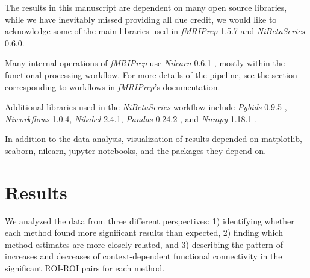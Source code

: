 \documentclass[phd,appendix,figures]{uithesis}
\begin{document}
The results in this manuscript are dependent on many open source
libraries, while we have inevitably missed providing all due credit,
we would like to acknowledge some of the main libraries used in 
\emph{fMRIPrep} 1.5.7\cite{fmriprep1} and \emph{NiBetaSeries} 0.6.0\cite{Kent2018}.

Many internal operations of \emph{fMRIPrep} use \emph{Nilearn} 0.6.1
\cite[RRID:SCR\_001362]{nilearn}, mostly within the functional
processing workflow. For more details of the pipeline, see
\href{https://fmriprep.readthedocs.io/en/latest/workflows.html}{the
section corresponding to workflows in \emph{fMRIPrep}'s documentation}.

Additional libraries used in the \emph{NiBetaSeries} workflow include
\emph{Pybids} 0.9.5 \cite{Yarkoni2019}, \emph{Niworkflows} 1.0.4,
\emph{Nibabel} 2.4.1, \emph{Pandas} 0.24.2 \cite{McKinney2010}, and
\emph{Numpy} 1.18.1 \cite{VanDerWalt2011, Oliphant2006}.

In addition to the data analysis, visualization of results depended
on matplotlib\cite{Hunter2007}, seaborn\cite{Waskom2020}, nilearn,
jupyter notebooks\cite{Kluyver2016a}, and the packages they depend on.

\section{Results}
We analyzed the data from three different perspectives:
1) identifying whether each method found more significant results than expected,
2) finding which method estimates are more closely related, and
3) describing the pattern of increases and decreases of context-dependent functional connectivity
in the significant ROI-ROI pairs for each method.
\end{document}
